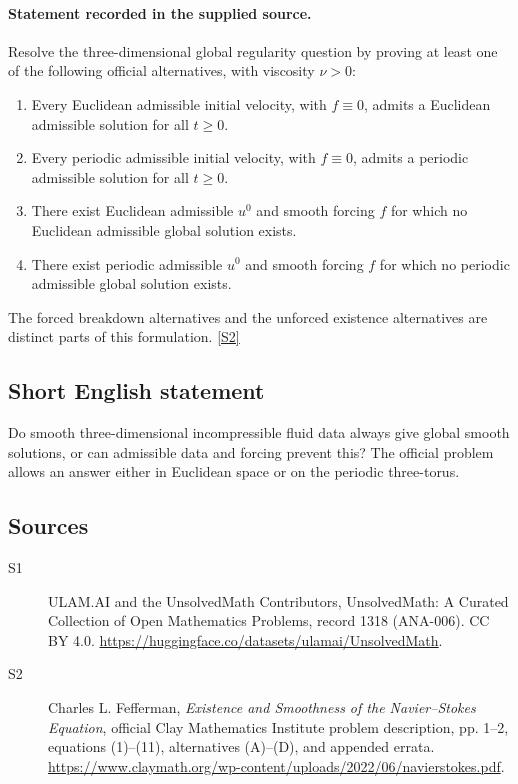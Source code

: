 \documentclass[11pt]{article}
\newcommand{\sref}[2]{\hyperlink{source:#1:#2}{[S#2]}}
\begin{document}
\paragraph{Statement recorded in the supplied source.}
Resolve the three-dimensional global regularity question by proving at least one of the following official alternatives, with viscosity $\nu>0$:
\begin{enumerate}
\item[(A)] Every Euclidean admissible initial velocity, with $f\equiv0$, admits a Euclidean admissible solution for all $t\geq0$.
\item[(B)] Every periodic admissible initial velocity, with $f\equiv0$, admits a periodic admissible solution for all $t\geq0$.
\item[(C)] There exist Euclidean admissible $u^0$ and smooth forcing $f$ for which no Euclidean admissible global solution exists.
\item[(D)] There exist periodic admissible $u^0$ and smooth forcing $f$ for which no periodic admissible global solution exists.
\end{enumerate}
The forced breakdown alternatives and the unforced existence alternatives are distinct parts of this formulation. \sref{1318}{2}

\subsection{Short English statement}
Do smooth three-dimensional incompressible fluid data always give global smooth solutions, or can admissible data and forcing prevent this? The official problem allows an answer either in Euclidean space or on the periodic three-torus.
\subsection{Sources}
\begin{description}
\item[\hypertarget{source:1318:1}{S1}] ULAM.AI and the UnsolvedMath Contributors, UnsolvedMath: A Curated Collection of Open Mathematics Problems, record 1318 (ANA-006). CC BY 4.0. \url{https://huggingface.co/datasets/ulamai/UnsolvedMath}.
\item[\hypertarget{source:1318:2}{S2}] Charles L. Fefferman, \emph{Existence and Smoothness of the Navier--Stokes Equation}, official Clay Mathematics Institute problem description, pp. 1--2, equations (1)--(11), alternatives (A)--(D), and appended errata. \url{https://www.claymath.org/wp-content/uploads/2022/06/navierstokes.pdf}.
\end{description}
\label{end:1318}
\end{document}
